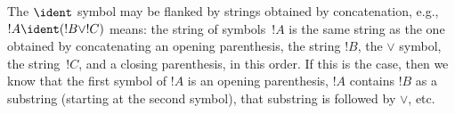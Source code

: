 \documentclass[../../../include/open-logic-section]{subfiles}
\begin{document}
The $\ident$ symbol may be flanked by strings obtained by
concatenation, e.g., $!A \ident (!B \lor !C)$ means: the string of
symbols~$!A$ is the same string as the one obtained by concatenating
an opening parenthesis, the string $!B$, the $\lor$ symbol, the
string~$!C$, and a closing parenthesis, in this order. If this is the
case, then we know that the first symbol of $!A$ is an opening
parenthesis, $!A$ contains $!B$ as a substring (starting at the second
symbol), that substring is followed by $\lor$, etc.
\end{document}
